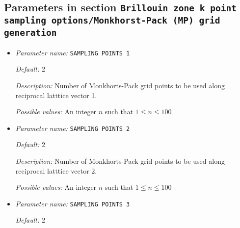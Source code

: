 \subsection{Parameters in section \tt Brillouin zone k point sampling options/Monkhorst-Pack (MP) grid generation}
\label{parameters:Brillouin_20zone_20k_20point_20sampling_20options/Monkhorst_2dPack_20_28MP_29_20grid_20generation}

\begin{itemize}
\item {\it Parameter name:} {\tt SAMPLING POINTS 1}
\label{parameters:Brillouin zone k point sampling options/Monkhorst_2dPack _28MP_29 grid generation/SAMPLING POINTS 1}
\label{parameters:Brillouin_20zone_20k_20point_20sampling_20options/Monkhorst_2dPack_20_28MP_29_20grid_20generation/SAMPLING_20POINTS_201}


{\it Default:} 2


{\it Description:} Number of Monkhorts-Pack grid points to be used along reciprocal latttice vector 1.


{\it Possible values:} An integer $n$ such that $1\leq n \leq 100$
\item {\it Parameter name:} {\tt SAMPLING POINTS 2}
\label{parameters:Brillouin zone k point sampling options/Monkhorst_2dPack _28MP_29 grid generation/SAMPLING POINTS 2}
\label{parameters:Brillouin_20zone_20k_20point_20sampling_20options/Monkhorst_2dPack_20_28MP_29_20grid_20generation/SAMPLING_20POINTS_202}


{\it Default:} 2


{\it Description:} Number of Monkhorts-Pack grid points to be used along reciprocal latttice vector 2.


{\it Possible values:} An integer $n$ such that $1\leq n \leq 100$
\item {\it Parameter name:} {\tt SAMPLING POINTS 3}
\label{parameters:Brillouin zone k point sampling options/Monkhorst_2dPack _28MP_29 grid generation/SAMPLING POINTS 3}
\label{parameters:Brillouin_20zone_20k_20point_20sampling_20options/Monkhorst_2dPack_20_28MP_29_20grid_20generation/SAMPLING_20POINTS_203}


{\it Default:} 2



\end{itemize}
